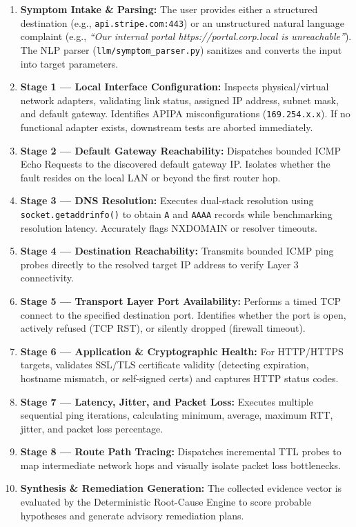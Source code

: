 \documentclass[
]{article}
\providecommand{\tightlist}{%
  \setlength{\itemsep}{0pt}\setlength{\parskip}{0pt}}
\begin{document}
\begin{enumerate}
\tightlist
\item \textbf{Symptom Intake \& Parsing:} The user provides either a structured destination (e.g., \texttt{api.stripe.com:443}) or an unstructured natural language complaint (e.g., \textit{``Our internal portal https://portal.corp.local is unreachable''}). The NLP parser (\texttt{llm/symptom\_parser.py}) sanitizes and converts the input into target parameters.
\item \textbf{Stage 1 --- Local Interface Configuration:} Inspects physical/virtual network adapters, validating link status, assigned IP address, subnet mask, and default gateway. Identifies APIPA misconfigurations (\texttt{169.254.x.x}). If no functional adapter exists, downstream tests are aborted immediately.
\item \textbf{Stage 2 --- Default Gateway Reachability:} Dispatches bounded ICMP Echo Requests to the discovered default gateway IP. Isolates whether the fault resides on the local LAN or beyond the first router hop.
\item \textbf{Stage 3 --- DNS Resolution:} Executes dual-stack resolution using \texttt{socket.getaddrinfo()} to obtain \texttt{A} and \texttt{AAAA} records while benchmarking resolution latency. Accurately flags NXDOMAIN or resolver timeouts.
\item \textbf{Stage 4 --- Destination Reachability:} Transmits bounded ICMP ping probes directly to the resolved target IP address to verify Layer 3 connectivity.
\item \textbf{Stage 5 --- Transport Layer Port Availability:} Performs a timed TCP connect to the specified destination port. Identifies whether the port is open, actively refused (TCP RST), or silently dropped (firewall timeout).
\item \textbf{Stage 6 --- Application \& Cryptographic Health:} For HTTP/HTTPS targets, validates SSL/TLS certificate validity (detecting expiration, hostname mismatch, or self-signed certs) and captures HTTP status codes.
\item \textbf{Stage 7 --- Latency, Jitter, and Packet Loss:} Executes multiple sequential ping iterations, calculating minimum, average, maximum RTT, jitter, and packet loss percentage.
\item \textbf{Stage 8 --- Route Path Tracing:} Dispatches incremental TTL probes to map intermediate network hops and visually isolate packet loss bottlenecks.
\item \textbf{Synthesis & Remediation Generation:} The collected evidence vector is evaluated by the Deterministic Root-Cause Engine to score probable hypotheses and generate advisory remediation plans.
\end{enumerate}
\end{document}
